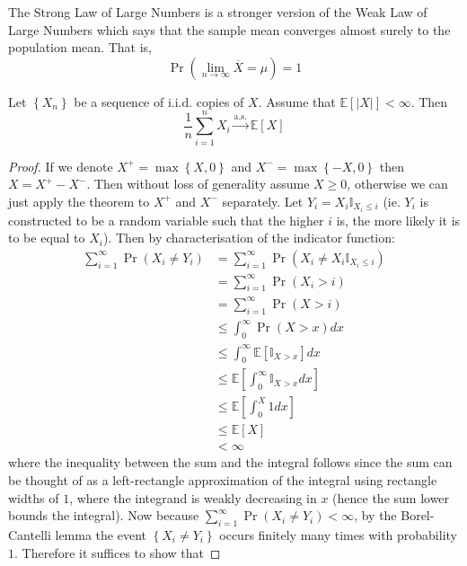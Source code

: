 \documentclass[11pt]{report} %
\begin{document}
The Strong Law of Large Numbers is a stronger version of the Weak Law of Large Numbers which says that the sample mean converges almost surely to the population mean. That is,
\begin{equation}
\operatorname{Pr}\left(\lim_{n\to\infty}\overline{X} = \mu\right) = 1
\end{equation}
\begin{theorem}
Let $\left\{X_{n}\right\}$ be a sequence of i.i.d. copies of $X$. Assume that $\mathbb{E}\left[\left|X\right|\right] < \infty$. Then
\begin{equation}
\dfrac{1}{n}\sum_{i = 1}^{n}X_{i} \overset{\mathrm{a.s.}}{\to} \mathbb{E}\left[X\right]
\end{equation}
\end{theorem}
\begin{proof}
If we denote $X^{+} = \max\left\{X, 0\right\}$ and $X^{-} = \max\left\{-X, 0\right\}$ then $X = X^{+} - X^{-}$. Then without loss of generality assume $X \geq 0$, otherwise we can just apply the theorem to $X^{+}$ and $X^{-}$ separately. Let $Y_{i} = X_{i}\mathbb{I}_{X_{i} \leq i}$ (ie. $Y_{i}$ is constructed to be a random variable such that the higher $i$ is, the more likely it is to be equal to $X_{i}$). Then by characterisation of the indicator function:
\begin{align}
\sum_{i = 1}^{\infty}\operatorname{Pr}\left(X_{i} \neq Y_{i}\right) &= \sum_{i = 1}^{\infty}\operatorname{Pr}\left(X_{i} \neq X_{i}\mathbb{I}_{X_{i} \leq i}\right)\\
&= \sum_{i = 1}^{\infty}\operatorname{Pr}\left(X_{i} > i\right) \\
&= \sum_{i = 1}^{\infty}\operatorname{Pr}\left(X > i\right) \\
&\leq \int_{0}^{\infty}\operatorname{Pr}\left(X > x\right)dx \\
&\leq \int_{0}^{\infty}\mathbb{E}\left[\mathbb{I}_{X > x}\right]dx \\
&\leq \mathbb{E}\left[\int_{0}^{\infty}\mathbb{I}_{X > x}dx\right] \\
&\leq \mathbb{E}\left[\int_{0}^{X}1dx\right] \\
&\leq \mathbb{E}\left[X\right] \\
&< \infty
\end{align}
where the inequality between the sum and the integral follows since the sum can be thought of as a left-rectangle approximation of the integral using rectangle widths of $1$, where the integrand is weakly decreasing in $x$ (hence the sum lower bounds the integral). Now because $\sum_{i = 1}^{\infty}\operatorname{Pr}\left(X_{i} \neq Y_{i}\right) < \infty$, by the Borel-Cantelli lemma the event $\left\{X_{i} \neq Y_{i}\right\}$ occurs finitely many times with probability $1$. Therefore it suffices to show that

\end{proof}
\end{document}
